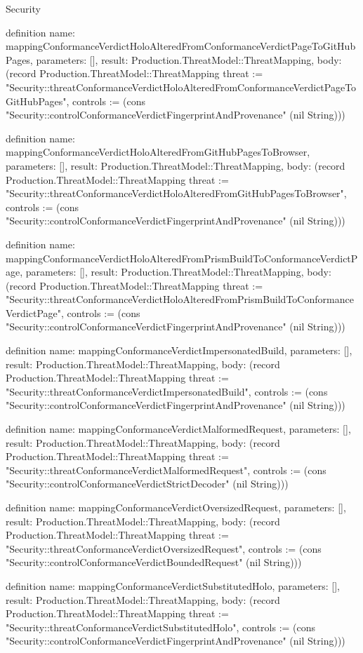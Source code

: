 \begin{lexlean}{Security}
\begin{semanticmodule}
definition{
  name: mappingConformanceVerdictHoloAlteredFromConformanceVerdictPageToGitHubPages,
  parameters: [],
  result: Production.ThreatModel::ThreatMapping,
  body: (record Production.ThreatModel::ThreatMapping {threat := "Security::threatConformanceVerdictHoloAlteredFromConformanceVerdictPageToGitHubPages", controls := (cons "Security::controlConformanceVerdictFingerprintAndProvenance" (nil String))})
}

definition{
  name: mappingConformanceVerdictHoloAlteredFromGitHubPagesToBrowser,
  parameters: [],
  result: Production.ThreatModel::ThreatMapping,
  body: (record Production.ThreatModel::ThreatMapping {threat := "Security::threatConformanceVerdictHoloAlteredFromGitHubPagesToBrowser", controls := (cons "Security::controlConformanceVerdictFingerprintAndProvenance" (nil String))})
}

definition{
  name: mappingConformanceVerdictHoloAlteredFromPrismBuildToConformanceVerdictPage,
  parameters: [],
  result: Production.ThreatModel::ThreatMapping,
  body: (record Production.ThreatModel::ThreatMapping {threat := "Security::threatConformanceVerdictHoloAlteredFromPrismBuildToConformanceVerdictPage", controls := (cons "Security::controlConformanceVerdictFingerprintAndProvenance" (nil String))})
}

definition{
  name: mappingConformanceVerdictImpersonatedBuild,
  parameters: [],
  result: Production.ThreatModel::ThreatMapping,
  body: (record Production.ThreatModel::ThreatMapping {threat := "Security::threatConformanceVerdictImpersonatedBuild", controls := (cons "Security::controlConformanceVerdictFingerprintAndProvenance" (nil String))})
}

definition{
  name: mappingConformanceVerdictMalformedRequest,
  parameters: [],
  result: Production.ThreatModel::ThreatMapping,
  body: (record Production.ThreatModel::ThreatMapping {threat := "Security::threatConformanceVerdictMalformedRequest", controls := (cons "Security::controlConformanceVerdictStrictDecoder" (nil String))})
}

definition{
  name: mappingConformanceVerdictOversizedRequest,
  parameters: [],
  result: Production.ThreatModel::ThreatMapping,
  body: (record Production.ThreatModel::ThreatMapping {threat := "Security::threatConformanceVerdictOversizedRequest", controls := (cons "Security::controlConformanceVerdictBoundedRequest" (nil String))})
}

definition{
  name: mappingConformanceVerdictSubstitutedHolo,
  parameters: [],
  result: Production.ThreatModel::ThreatMapping,
  body: (record Production.ThreatModel::ThreatMapping {threat := "Security::threatConformanceVerdictSubstitutedHolo", controls := (cons "Security::controlConformanceVerdictFingerprintAndProvenance" (nil String))})
}


\end{semanticmodule}
\end{lexlean}
